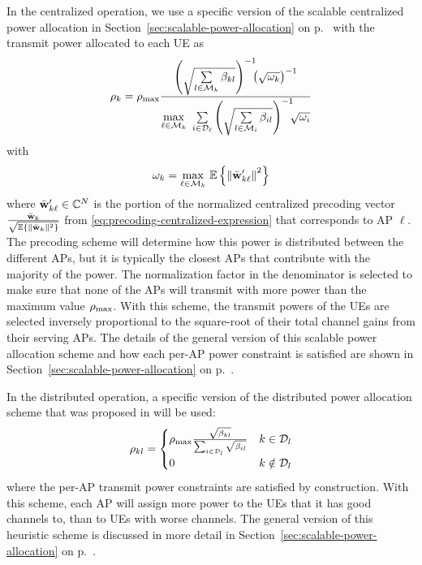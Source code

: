 In the centralized operation, we use a specific version of the scalable centralized power allocation in Section~\ref{sec:scalable-power-allocation} on p.~\pageref{sec:scalable-power-allocation} with the transmit power allocated to each UE as
\begin{align}\label{eq:fractional_power_centralized_DL}
\rho_k=\rho_{\textrm{max}} \frac{\left(\sqrt{\sum\limits_{l\in\mathcal{M}_k}\beta_{kl}}\right)^{-1}\!\!\!\left(\sqrt{\omega_k}\right)^{-1}}{\underset{\ell\in \mathcal{M}_k}{\max} \  \sum\limits_{i\in \mathcal{D}_{\ell}}   \left(\sqrt{\sum\limits_{l\in\mathcal{M}_i}\beta_{il}}\right)^{-1}\!\!\!\sqrt{\omega_i}}
\end{align}
with
\begin{align}
\omega_k = \underset{\ell\in\mathcal{M}_k}{\max} \ \mathbb{E} \left\{ \left\| \bar{\mathbf{w}}_{k\ell}^{\prime} \right\|^2 \right\}
\end{align} 
where $\bar{\mathbf{w}}_{k\ell}^{\prime} \in \mathbb{C}^{N}$ is the portion of the normalized centralized precoding vector $\frac{\bar{\mathbf{w}}_k}{\sqrt{\mathbb{E} \left\{ \| \bar{\mathbf{w}}_k \|^2 \right\} }}$ from \eqref{eq:precoding-centralized-expression} that corresponds to AP $\ell$. The precoding scheme will determine how this power is distributed between the different APs, but it is typically the closest APs that contribute with the majority of the power. The normalization factor in the denominator is selected to make sure that none of the APs will transmit with more power than the maximum value $\rho_{\textrm{max}}$.  With this scheme, the transmit powers of the UEs are selected inversely proportional to the square-root of their total channel gains from their serving APs. The details of the general version of this scalable power allocation scheme and how each per-AP power constraint is satisfied are shown in  Section~\ref{sec:scalable-power-allocation} on p.~\pageref{sec:scalable-power-allocation}. 

In the distributed operation, a specific version of the distributed power allocation scheme that was proposed in  \cite{Interdonato2019a} will be used:
\begin{equation} \label{eq:fractional_power_DL-section6}
\rho_{kl} = \begin{cases} \rho_{\textrm{max}} \frac{ \sqrt{\beta_{kl}}}{\sum_{i \in \mathcal{D}_l} \sqrt{\beta_{il}}} & k \in \mathcal{D}_l\\
0 &  k \notin \mathcal{D}_l
\end{cases}
\end{equation}
where the per-AP transmit power constraints are satisfied by construction. With this scheme, each AP will assign more power to the UEs that it has good channels to, than to UEs with worse channels. The general version of this heuristic scheme is discussed in more detail in Section~\ref{sec:scalable-power-allocation} on p.~\pageref{sec:scalable-power-allocation}.


